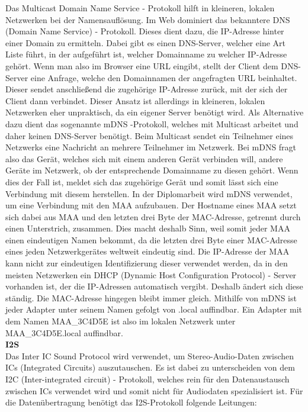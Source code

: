 \documentclass[11pt, twoside]{article}
\begin{document}
Das Multicast Domain Name Service - Protokoll hilft in kleineren, lokalen Netzwerken bei der Namensauflösung. Im Web dominiert das bekanntere DNS (Domain Name Service) - Protokoll. Dieses dient dazu, die IP-Adresse hinter einer Domain zu ermitteln. Dabei gibt es einen DNS-Server, welcher eine Art  Liste führt, in der aufgeführt ist, welcher Domainname zu welcher IP-Adresse gehört. Wenn man also im Browser eine URL eingibt, stellt der Client dem DNS-Server eine Anfrage, welche den Domainnamen der angefragten URL beinhaltet. Dieser sendet anschließend die zugehörige IP-Adresse zurück, mit der sich der Client dann verbindet. Dieser Ansatz ist allerdings in kleineren, lokalen Netzwerken eher unpraktisch, da ein eigener Server benötigt wird. Als Alternative dazu dient das sogenannte mDNS -Protokoll, welches mit Multicast arbeitet und daher keinen DNS-Server benötigt. Beim Multicast sendet ein Teilnehmer eines Netzwerks eine Nachricht an mehrere Teilnehmer im Netzwerk. Bei mDNS fragt also das Gerät, welches sich mit einem anderen Gerät verbinden will, andere Geräte im Netzwerk, ob der entsprechende Domainname zu diesen gehört. Wenn dies der Fall ist, meldet sich das zugehörige Gerät und somit lässt sich eine Verbindung mit diesem herstellen. \parencite[vgl.][]{noauthor_urlpi19_2022} In der Diplomarbeit wird mDNS verwendet, um eine Verbindung mit den MAA aufzubauen. Der Hostname eines MAA setzt sich dabei aus \glqq MAA\grqq{} und den letzten drei Byte der MAC-Adresse, getrennt durch einen Unterstrich, zusammen. Dies macht deshalb Sinn, weil somit jeder MAA einen eindeutigen Namen bekommt, da die letzten drei Byte einer MAC-Adresse eines jeden Netzwerkgerätes weltweit eindeutig sind. Die IP-Adresse der MAA kann nicht zur eindeutigen Identifizierung dieser verwendet werden, da in den meisten Netzwerken ein DHCP (Dynamic Host Configuration Protocol) - Server vorhanden ist, der die IP-Adressen automatisch vergibt. Deshalb ändert sich diese ständig. Die MAC-Adresse hingegen bleibt immer gleich. \parencite[vgl.][]{noauthor_urlpi20_nodate} Mithilfe von mDNS ist jeder Adapter unter seinem Namen gefolgt von \glqq .local\grqq{} auffindbar. Ein Adapter mit dem Namen \glqq MAA\_3C4D5E\grqq{} ist also im lokalen Netzwerk unter \glqq MAA\_3C4D5E.local\grqq{} auffindbar.
\newline \\
\textbf{I2S}\\
Das \glqq Inter IC Sound Protocol\grqq{} wird verwendet, um Stereo-Audio-Daten zwischen ICs (Integrated Circuits) auszutauschen. Es ist dabei zu unterscheiden von dem I2C (Inter-integrated circuit) - Protokoll, welches rein für den Datenaustausch zwischen ICs verwendet wird und somit nicht für Audiodaten spezialisiert ist. Für die Datenübertragung benötigt das I2S-Protokoll folgende Leitungen:
\end{document}
